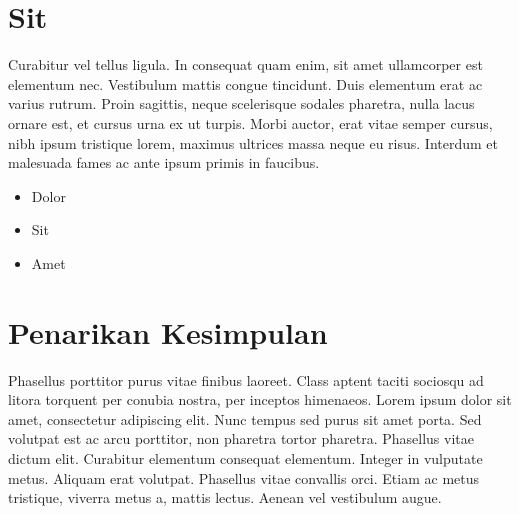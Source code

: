 \section{Sit}

Curabitur vel tellus ligula. In consequat quam enim, sit amet
ullamcorper est elementum nec. Vestibulum mattis congue
tincidunt. Duis elementum erat ac varius rutrum. Proin sagittis, neque
scelerisque sodales pharetra, nulla lacus ornare est, et cursus urna
ex ut turpis. Morbi auctor, erat vitae semper cursus, nibh ipsum
tristique lorem, maximus ultrices massa neque eu risus. Interdum et
malesuada fames ac ante ipsum primis in faucibus.

\begin{itemize}
\item Dolor
\item Sit
\item Amet
\end{itemize}


\section{Penarikan Kesimpulan}

Phasellus porttitor purus \textcite{warn} vitae finibus laoreet. Class
aptent taciti sociosqu ad litora torquent per conubia nostra, per
inceptos himenaeos. Lorem ipsum dolor sit amet, consectetur adipiscing
elit. Nunc tempus sed purus sit amet porta. Sed volutpat est ac arcu
porttitor, non pharetra tortor pharetra. Phasellus vitae dictum
elit. Curabitur elementum consequat elementum. Integer in vulputate
metus. Aliquam erat volutpat. Phasellus vitae convallis orci. Etiam ac
metus tristique, viverra metus a, mattis lectus. Aenean vel vestibulum
augue.
